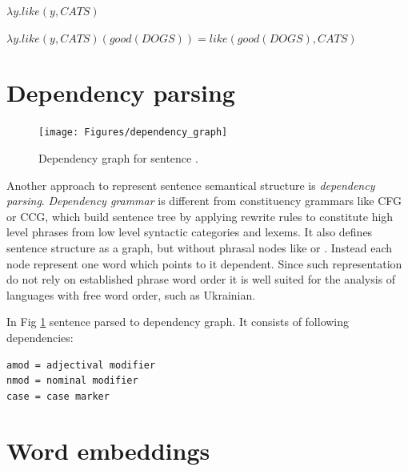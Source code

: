 $\lambda y.like(y, CATS)$

$\lambda y.like(y, CATS)(good(DOGS))=like(good(DOGS), CATS)$

\section{Dependency parsing}

\begin{figure}[h]
\centering
\texttt{[image: Figures/dependency\_graph]}
\decoRule
\caption[Dependency graph]{Dependency graph for sentence \protect\footnotemark.}
\label{fig:dependency_graph}
\end{figure}


Another approach to represent sentence semantical structure is \emph{dependency parsing}. \emph{Dependency grammar} is different from constituency grammars like CFG or CCG, which build sentence tree by applying rewrite rules to constitute high level phrases from low level syntactic categories and lexems. It also defines sentence structure as a graph, but without phrasal nodes like  or . Instead each node represent one word which points to it dependent. Since such representation do not rely on established phrase word order it is well suited for the analysis of languages with free word order, such as Ukrainian.

In Fig \ref{fig:dependency_graph} sentence  parsed to dependency graph. It consists of following dependencies: 

\begin{verbatim}
amod = adjectival modifier
nmod = nominal modifier
case = case marker
\end{verbatim}

\section{Word embeddings}

